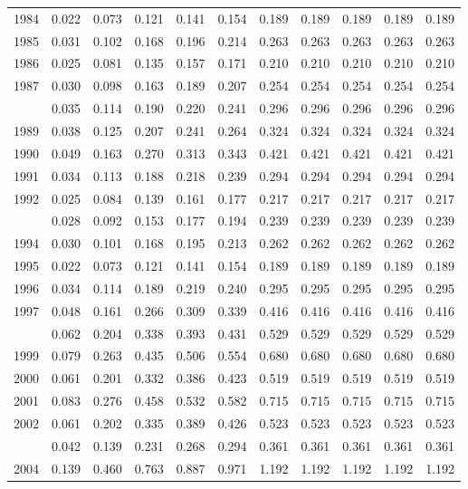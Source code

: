 \documentclass[
]{article}
\begin{document}
\begin{longtable}[t]{lrrrrrrrrrr}
1984 & 0.022 & 0.073 & 0.121 & 0.141 & 0.154 & 0.189 & 0.189 & 0.189 & 0.189 & 0.189\\
1985 & 0.031 & 0.102 & 0.168 & 0.196 & 0.214 & 0.263 & 0.263 & 0.263 & 0.263 & 0.263\\
1986 & 0.025 & 0.081 & 0.135 & 0.157 & 0.171 & 0.210 & 0.210 & 0.210 & 0.210 & 0.210\\
1987 & 0.030 & 0.098 & 0.163 & 0.189 & 0.207 & 0.254 & 0.254 & 0.254 & 0.254 & 0.254\\
\addlinespace
1988 & 0.035 & 0.114 & 0.190 & 0.220 & 0.241 & 0.296 & 0.296 & 0.296 & 0.296 & 0.296\\
1989 & 0.038 & 0.125 & 0.207 & 0.241 & 0.264 & 0.324 & 0.324 & 0.324 & 0.324 & 0.324\\
1990 & 0.049 & 0.163 & 0.270 & 0.313 & 0.343 & 0.421 & 0.421 & 0.421 & 0.421 & 0.421\\
1991 & 0.034 & 0.113 & 0.188 & 0.218 & 0.239 & 0.294 & 0.294 & 0.294 & 0.294 & 0.294\\
1992 & 0.025 & 0.084 & 0.139 & 0.161 & 0.177 & 0.217 & 0.217 & 0.217 & 0.217 & 0.217\\
\addlinespace
1993 & 0.028 & 0.092 & 0.153 & 0.177 & 0.194 & 0.239 & 0.239 & 0.239 & 0.239 & 0.239\\
1994 & 0.030 & 0.101 & 0.168 & 0.195 & 0.213 & 0.262 & 0.262 & 0.262 & 0.262 & 0.262\\
1995 & 0.022 & 0.073 & 0.121 & 0.141 & 0.154 & 0.189 & 0.189 & 0.189 & 0.189 & 0.189\\
1996 & 0.034 & 0.114 & 0.189 & 0.219 & 0.240 & 0.295 & 0.295 & 0.295 & 0.295 & 0.295\\
1997 & 0.048 & 0.161 & 0.266 & 0.309 & 0.339 & 0.416 & 0.416 & 0.416 & 0.416 & 0.416\\
\addlinespace
1998 & 0.062 & 0.204 & 0.338 & 0.393 & 0.431 & 0.529 & 0.529 & 0.529 & 0.529 & 0.529\\
1999 & 0.079 & 0.263 & 0.435 & 0.506 & 0.554 & 0.680 & 0.680 & 0.680 & 0.680 & 0.680\\
2000 & 0.061 & 0.201 & 0.332 & 0.386 & 0.423 & 0.519 & 0.519 & 0.519 & 0.519 & 0.519\\
2001 & 0.083 & 0.276 & 0.458 & 0.532 & 0.582 & 0.715 & 0.715 & 0.715 & 0.715 & 0.715\\
2002 & 0.061 & 0.202 & 0.335 & 0.389 & 0.426 & 0.523 & 0.523 & 0.523 & 0.523 & 0.523\\
\addlinespace
2003 & 0.042 & 0.139 & 0.231 & 0.268 & 0.294 & 0.361 & 0.361 & 0.361 & 0.361 & 0.361\\
2004 & 0.139 & 0.460 & 0.763 & 0.887 & 0.971 & 1.192 & 1.192 & 1.192 & 1.192 & 1.192\\

\end{longtable}
\end{document}
